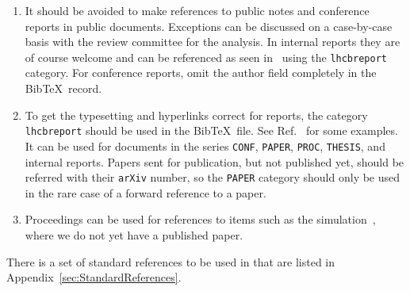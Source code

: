 \begin{enumerate}
\item It should be avoided to make references to public notes and
  conference reports in public documents. Exceptions can be discussed
  on a case-by-case basis with the review committee for the
  analysis. In internal reports they are of course welcome and can be
  referenced as seen in~\cite{LHCb-CONF-2011-003} using the
  \texttt{lhcbreport} category. For conference reports, omit the
  author field completely in the Bib\TeX\ record.

\item To get the typesetting and hyperlinks correct for \lhcb reports,
  the category \texttt{lhcbreport} should be used in the Bib\TeX\
  file. See Ref.~\cite{LHCb-INT-2011-047, *LHCb-ANA-2011-078} for some
  examples. It can be used for \lhcb documents in the series
  \texttt{CONF}, \texttt{PAPER}, \texttt{PROC}, \texttt{THESIS}, and
  internal \lhcb reports. Papers sent for publication, but not
  published yet, should be referred with their \texttt{arXiv} number,
  so the \texttt{PAPER} category should only be used in the rare case
  of a forward reference to a paper.

\item Proceedings can be used for references to items such as the
  \lhcb simulation~\cite{LHCb-PROC-2011-006}, where we do not yet have
  a published paper.

\end{enumerate}

There is a set of standard references to be used in \lhcb that are
listed in Appendix~\ref{sec:StandardReferences}.
